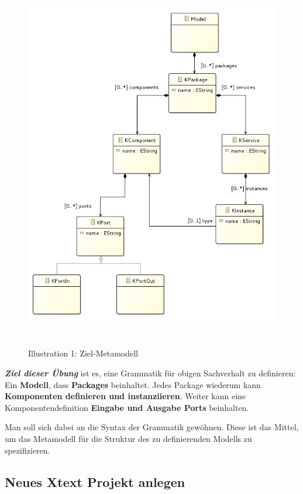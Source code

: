 \documentclass[a4]{article}
\begin{document}
\begin{figure}
\centering
\includegraphics[width=5.12520in,height=6.50830in]{./Pictures/10000201000002670000030DD0AB9EF4251EDB4D.png}
\caption{Illustration 1: Ziel-Metamodell}
\end{figure}

\emph{\textbf{Ziel dieser Übung }}ist es, eine Grammatik für obigen
Sachverhalt zu definieren: Ein \textbf{Modell}, dass \textbf{Packages
}beinhaltet. Jedes Package wiederum kann \textbf{Komponenten definieren
und instanziieren}. Weiter kann eine Komponentendefinition
\textbf{Eingabe und Ausgabe Ports }beinhalten.

Man soll sich dabei an die Syntax der Grammatik gewöhnen. Diese ist das
Mittel, um das Metamodell für die Struktur des zu definierenden Modells
zu spezifizieren.

\subsection[Neues Xtext Projekt
anlegen]{\texorpdfstring{\protect\hypertarget{anchor-18}{}{}Neues Xtext
Projekt
anlegen}{Neues Xtext Projekt anlegen}}\label{neues-xtext-projekt-anlegen}
\end{document}

